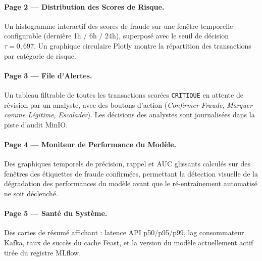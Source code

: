 \documentclass[12pt,a4paper,oneside]{book}
\theoremstyle{definition}
\theoremstyle{plain}
\begin{document}
\paragraph{Page 2 — Distribution des Scores de Risque.}
Un histogramme interactif des scores de fraude sur une fenêtre temporelle configurable (dernière 1h / 6h / 24h), superposé avec le seuil de décision $\tau = 0,697$. Un graphique circulaire Plotly montre la répartition des transactions par catégorie de risque.

\paragraph{Page 3 — File d'Alertes.}
Un tableau filtrable de toutes les transactions scorées \texttt{CRITIQUE} en attente de révision par un analyste, avec des boutons d'action (\textit{Confirmer Fraude}, \textit{Marquer comme Légitime}, \textit{Escalader}). Les décisions des analystes sont journalisées dans la piste d'audit MinIO.

\paragraph{Page 4 — Moniteur de Performance du Modèle.}
Des graphiques temporels de précision, rappel et AUC glissants calculés sur des fenêtres des étiquettes de fraude confirmées, permettant la détection visuelle de la dégradation des performances du modèle avant que le ré-entraînement automatisé ne soit déclenché.

\paragraph{Page 5 — Santé du Système.}
Des cartes de résumé affichant : latence API p50/p95/p99, lag consommateur Kafka, taux de succès du cache Feast, et la version du modèle actuellement actif tirée du registre MLflow.
\end{document}

